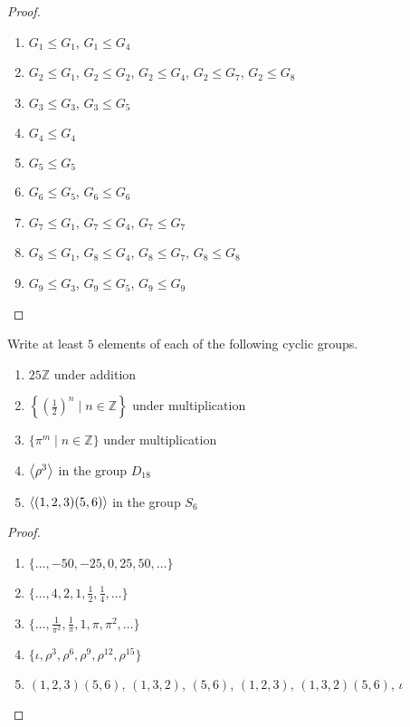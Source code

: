 \begin{proof}
    \begin{enumerate}
        \item $G_{1} \leq G_{1}$, $G_{1} \leq G_{4}$
        \item $G_{2} \leq G_{1}$, $G_{2} \leq G_{2}$, $G_{2} \leq G_{4}$, $G_{2} \leq G_{7}$, $G_{2} \leq G_{8}$
        \item $G_{3} \leq G_{3}$, $G_{3} \leq G_{5}$
        \item $G_{4} \leq G_{4}$
        \item $G_{5} \leq G_{5}$
        \item $G_{6} \leq G_{5}$, $G_{6} \leq G_{6}$
        \item $G_{7} \leq G_{1}$, $G_{7} \leq G_{4}$, $G_{7} \leq G_{7}$
        \item $G_{8} \leq G_{1}$, $G_{8} \leq G_{4}$, $G_{8} \leq G_{7}$, $G_{8} \leq G_{8}$
        \item $G_{9} \leq G_{3}$, $G_{9} \leq G_{5}$, $G_{9} \leq G_{9}$
    \end{enumerate}
\end{proof}

\begin{exercise}
    Write at least $5$ elements of each of the following cyclic groups.
    \begin{enumerate}[label={\textbf{\alph*.}}]
        \item $25\mathbb{Z}$ under addition
        \item $\left\{ {\left(\frac{1}{2}\right)}^{n} \mid n\in\mathbb{Z} \right\}$ under multiplication
        \item $\{ \pi^{m} \mid n\in\mathbb{Z} \}$ under multiplication
        \item $\left\langle{\rho^{3}}\right\rangle$ in the group $D_{18}$
        \item $\left\langle{(1, 2, 3)(5, 6)}\right\rangle$ in the group $S_{6}$
    \end{enumerate}
\end{exercise}

\begin{proof}
    \begin{enumerate}[label={\textbf{\alph*}}]
        \item $\{ \ldots, -50, -25, 0, 25, 50, \ldots \}$
        \item $\{ \ldots, 4, 2, 1, \frac{1}{2}, \frac{1}{4}, \ldots \}$
        \item $\{ \ldots, \frac{1}{\pi^{2}}, \frac{1}{\pi}, 1, \pi, \pi^{2}, \ldots \}$
        \item $\{ \iota, \rho^{3}, \rho^{6}, \rho^{9}, \rho^{12}, \rho^{15} \}$
        \item $(1, 2, 3)(5, 6)$, $(1, 3, 2)$, $(5, 6)$, $(1, 2, 3)$, $(1, 3, 2)(5, 6)$, $\iota$
    \end{enumerate}
\end{proof}

